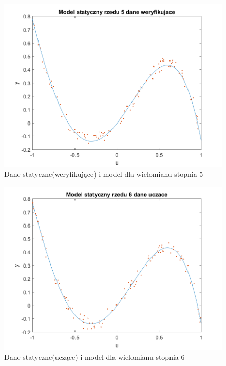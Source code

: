 \documentclass{article}
\begin{document}
\begin{figure}
\centering
\includegraphics[width=0.95\linewidth]{../dane_statyczne/dane_statyczne_model_rzedu_5_weryf}
\caption{Dane statyczne(weryfikujące) i model dla wielomianu stopnia 5}
\label{fig:danestatyczneweryf5}
\end{figure}

\begin{figure}
\centering
\includegraphics[width=0.95\linewidth]{../dane_statyczne/dane_statyczne_model_rzedu_6_uczace}
\caption{Dane statyczne(uczące) i model dla wielomianu stopnia 6}
\label{fig:danestatyczneuczace3}
\end{figure}
\end{document}
